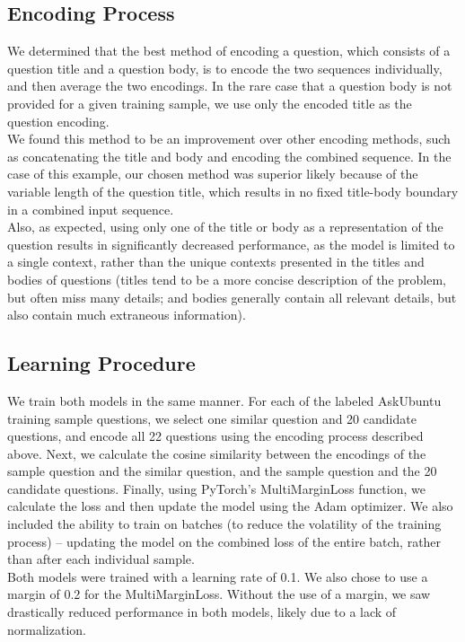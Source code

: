 \documentclass[12pt]{article}
\begin{document}
\subsection{Encoding Process}
We determined that the best method of encoding a question, which consists of a question title and a question body, is to encode the two sequences individually, and then average the two encodings. In the rare case that a question body is not provided for a given training sample, we use only the encoded title as the question encoding.\\

We found this method to be an improvement over other encoding methods, such as concatenating the title and body and encoding the combined sequence. In the case of this example, our chosen method was superior likely because of the variable length of the question title, which results in no fixed title-body boundary in a combined input sequence.\\

Also, as expected, using only one of the title or body as a representation of the question results in significantly decreased performance, as the model is limited to a single context, rather than the unique contexts presented in the titles and bodies of questions (titles tend to be a more concise description of the problem, but often miss many details; and bodies generally contain all relevant details, but also contain much extraneous information).

\subsection{Learning Procedure}
We train both models in the same manner. For each of the labeled AskUbuntu training sample questions, we select one similar question and 20 candidate questions, and encode all 22 questions using the encoding process described above. Next, we calculate the cosine similarity between the encodings of the sample question and the similar question, and the sample question and the 20 candidate questions. Finally, using PyTorch's MultiMarginLoss function, we calculate the loss and then update the model using the Adam optimizer. We also included the ability to train on batches (to reduce the volatility of the training process) -- updating the model on the combined loss of the entire batch, rather than after each individual sample.\\

Both models were trained with a learning rate of 0.1. We also chose to use a margin of 0.2 for the MultiMarginLoss. Without the use of a margin, we saw drastically reduced performance in both models, likely due to a lack of normalization.
\end{document}
